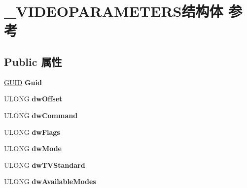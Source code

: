 \hypertarget{struct___v_i_d_e_o_p_a_r_a_m_e_t_e_r_s}{}\section{\+\_\+\+V\+I\+D\+E\+O\+P\+A\+R\+A\+M\+E\+T\+E\+R\+S结构体 参考}
\label{struct___v_i_d_e_o_p_a_r_a_m_e_t_e_r_s}
\subsection*{Public 属性}
\begin{DoxyCompactItemize}
\item 
\mbox{\label{struct___v_i_d_e_o_p_a_r_a_m_e_t_e_r_s_af2ab70e4f132aa160ec92b8b97f53073}} 
\hyperlink{interface_g_u_i_d}{G\+U\+ID} {\bfseries Guid}
\item 
\mbox{\label{struct___v_i_d_e_o_p_a_r_a_m_e_t_e_r_s_af4c5a9aeeaf50e9016efa287d020b444}} 
U\+L\+O\+NG {\bfseries dw\+Offset}
\item 
\mbox{\label{struct___v_i_d_e_o_p_a_r_a_m_e_t_e_r_s_a805a5b01d416148fa496e272bd515ee8}} 
U\+L\+O\+NG {\bfseries dw\+Command}
\item 
\mbox{\label{struct___v_i_d_e_o_p_a_r_a_m_e_t_e_r_s_ab133f0d4b9a66b0147803d8993586d98}} 
U\+L\+O\+NG {\bfseries dw\+Flags}
\item 
\mbox{\label{struct___v_i_d_e_o_p_a_r_a_m_e_t_e_r_s_ad9e80def576b4aeef98d7b451594b831}} 
U\+L\+O\+NG {\bfseries dw\+Mode}
\item 
\mbox{\label{struct___v_i_d_e_o_p_a_r_a_m_e_t_e_r_s_af4e368686e68c4a23fa827974e15ee14}} 
U\+L\+O\+NG {\bfseries dw\+T\+V\+Standard}
\item 
\mbox{\label{struct___v_i_d_e_o_p_a_r_a_m_e_t_e_r_s_a2f12727f7769b05ecda4ca6f3f18f6f7}} 
U\+L\+O\+NG {\bfseries dw\+Available\+Modes}
\item 
\mbox{\label{struct___v_i_d_e_o_p_a_r_a_m_e_t_e_r_s_a75fb10e461ba52084691792be31fcef4}} 

\end{DoxyCompactItemize}
